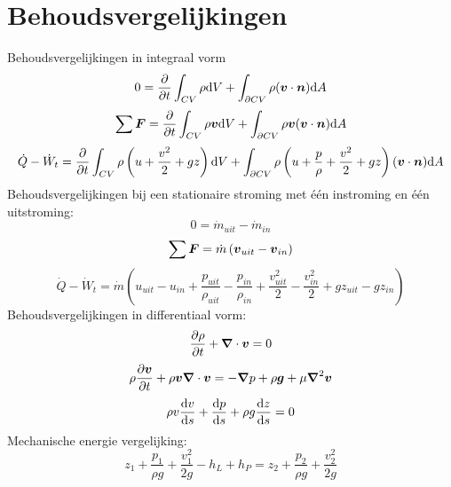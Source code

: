 	\section{Behoudsvergelijkingen}
Behoudsvergelijkingen in integraal vorm
\begin{equation}
	0 = \frac{\partial}{\partial t} \int_{CV} \rho \mathrm{d} V + \int_{\partial CV} \rho (\boldsymbol{v}\cdot \boldsymbol{n}) \mathrm{d} A
\end{equation}
\begin{equation}
	\sum \boldsymbol{F} = \frac{\partial}{\partial t} \int_{CV} \rho \boldsymbol{v} \mathrm{d} V + \int_{\partial CV} \rho \boldsymbol{v} (\boldsymbol{v}\cdot \boldsymbol{n}) \mathrm{d} A
\end{equation}
\begin{equation}
	\dot{Q}-\dot{W}_t = \frac{\partial}{\partial t} \int_{CV} \rho \left(u+\frac{v^2}{2}+g z \right) \mathrm{d} V + \int_{\partial CV} \rho \left(u+\frac{p}{\rho}+\frac{v^2}{2}+g z \right) (\boldsymbol{v}\cdot \boldsymbol{n}) \mathrm{d} A
\end{equation}
Behoudsvergelijkingen bij een stationaire stroming met één instroming en één uitstroming:
\begin{equation}
	0 = \dot{m}_{uit}-\dot{m}_{in}
\end{equation}
\begin{equation}
	\sum \boldsymbol{F} = \dot{m} \left( \boldsymbol{v}_{uit}-\boldsymbol{v}_{in} \right)
\end{equation}
\begin{equation}
	\dot{Q}-\dot{W}_t = \dot{m} \left(u_{uit}-u_{in}+\frac{p_{uit}}{\rho_{uit}}-\frac{p_{in}}{\rho_{in}}+\frac{v_{uit}^2}{2}-\frac{v_{in}^2}{2}+g z_{uit}-g z_{in} \right)
\end{equation}
Behoudsvergelijkingen in differentiaal vorm:
\begin{equation}
	\frac{\partial \rho}{\partial t} + \boldsymbol{\nabla} \cdot \boldsymbol{v} = 0
\end{equation}
\begin{equation}
	\rho \frac{\partial \boldsymbol{v}}{\partial t} + \rho \boldsymbol{v} \boldsymbol{\nabla} \cdot \boldsymbol{v} = -\boldsymbol{\nabla} p + \rho \boldsymbol{g} + \mu \boldsymbol{\nabla}^2 \boldsymbol{v}
\end{equation}
\begin{equation}
	\rho v \frac{\mathrm{d} v}{\mathrm{d} s} + \frac{\mathrm{d} p}{\mathrm{d} s} + \rho g \frac{\mathrm{d} z}{\mathrm{d} s} = 0
\end{equation}
Mechanische energie vergelijking:
\begin{equation}
	z_1 + \frac{p_1}{\rho g} + \frac{v_1^2}{2g}  - h_L + h_P = z_2 + \frac{p_2}{\rho g} + \frac{v_2^2}{2g}
\end{equation}


